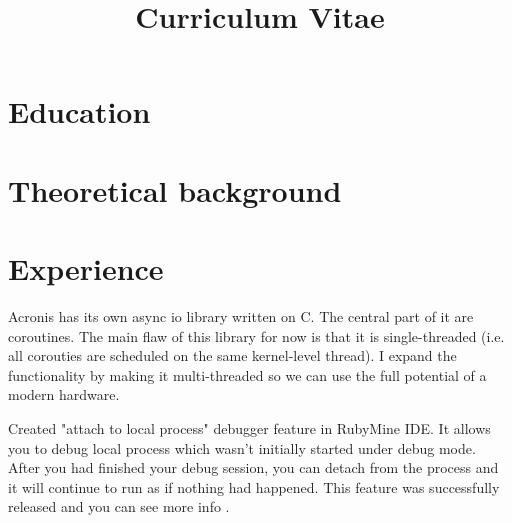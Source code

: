 \documentclass[10pt,a4paper,sans]{moderncv} %
\title{Curriculum Vitae}
\begin{document}
\makecvtitle %


\section{Education}



\section{Theoretical background}


\section{Experience}

{Acronis has its own async io library written on C. The central part of it are coroutines. The
main flaw of this library for now is that it is single-threaded (i.e. all corouties are scheduled on the same kernel-level thread).
I expand the functionality by making it multi-threaded so we can use the full potential of a modern hardware.}

{Created "attach to local process" debugger feature in RubyMine IDE. It allows you to 
debug local process which wasn't initially started under debug mode. After you had finished your
debug session, you can detach from the process and it will continue to run as if nothing
had happened. This feature was successfully released and you can see more info \href{https://www.jetbrains.com/help/ruby/attaching-to-local-process.html}{\color{blue}{here}}.}
\end{document}
